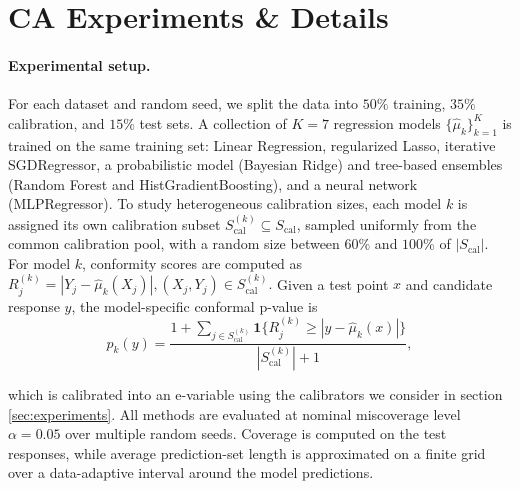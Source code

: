 \documentclass{article}
\theoremstyle{plain}
\theoremstyle{definition}
\theoremstyle{remark}
\begin{document}
\section{CA Experiments \& Details}
\label{app:agg_random_splits}


\paragraph{Experimental setup.}
For each dataset and random seed, we split the data into $50\%$ training, $35\%$ calibration, and $15\%$ test sets. 
A collection of $K=7$ regression models $\{\widehat{\mu}_k\}_{k=1}^K$ is trained on the same training set: Linear Regression, regularized Lasso, iterative SGDRegressor, a probabilistic model (Bayesian Ridge) and tree-based ensembles (Random Forest and HistGradientBoosting), and a neural network (MLPRegressor). 
To study heterogeneous calibration sizes, each model $k$ is assigned its own calibration subset 
$S_{\mathrm{cal}}^{(k)} \subseteq S_{\mathrm{cal}}$, sampled uniformly from the common calibration pool, with a random size between $60\%$ and $100\%$ of $|S_{\mathrm{cal}}|$. 
For model $k$, conformity scores are computed as $R_j^{(k)} = |Y_j - \widehat{\mu}_k(X_j)|, 
(X_j,Y_j) \in S_{\mathrm{cal}}^{(k)}.$
Given a test point $x$ and candidate response $y$, the model-specific conformal p-value is
\[
p_k(y) =
\frac{1 + \sum_{j \in S_{\mathrm{cal}}^{(k)}} 
\mathbf{1}\{R_j^{(k)} \ge |y-\widehat{\mu}_k(x)|\}}
{|S_{\mathrm{cal}}^{(k)}|+1},
\]

which is calibrated into an e-variable using the calibrators we consider in section \ref{sec:experiments}.
All methods are evaluated at nominal miscoverage level $\alpha=0.05$ over multiple random seeds. 
Coverage is computed on the test responses, while average prediction-set length is approximated on a finite grid over a data-adaptive interval around the model predictions. 
\end{document}
